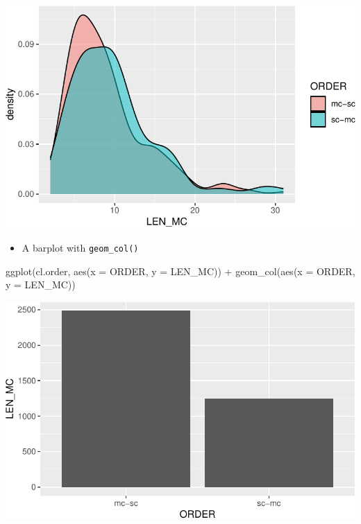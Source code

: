 \documentclass[
  11pt,
  letterpaper,
  DIV=11,
  numbers=noendperiod]{scrreprt}
\newenvironment{Shaded}{\begin{snugshade}}{\end{snugshade}}
\newcommand{\AttributeTok}[1]{\textcolor[rgb]{0.40,0.45,0.13}{#1}}
\newcommand{\FunctionTok}[1]{\textcolor[rgb]{0.28,0.35,0.67}{#1}}
\newcommand{\NormalTok}[1]{\textcolor[rgb]{0.00,0.23,0.31}{#1}}
\newcommand{\SpecialCharTok}[1]{\textcolor[rgb]{0.37,0.37,0.37}{#1}}
\providecommand{\tightlist}{%
  \setlength{\itemsep}{0pt}\setlength{\parskip}{0pt}}\usepackage{longtable,booktabs,array}
\begin{document}
\includegraphics{Summary_statistics_files/figure-pdf/unnamed-chunk-26-1.pdf}

\begin{itemize}
\tightlist
\item
  A barplot with \texttt{geom\_col()}
\end{itemize}

\begin{Shaded}
\begin{Highlighting}[]
\FunctionTok{ggplot}\NormalTok{(cl.order, }\FunctionTok{aes}\NormalTok{(}\AttributeTok{x =}\NormalTok{ ORDER, }\AttributeTok{y =}\NormalTok{ LEN\_MC)) }\SpecialCharTok{+}
  \FunctionTok{geom\_col}\NormalTok{(}\FunctionTok{aes}\NormalTok{(}\AttributeTok{x =}\NormalTok{ ORDER, }\AttributeTok{y =}\NormalTok{ LEN\_MC))}
\end{Highlighting}
\end{Shaded}

\includegraphics{Summary_statistics_files/figure-pdf/unnamed-chunk-27-1.pdf}
\end{document}

